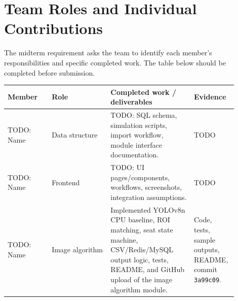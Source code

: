 \section{Team Roles and Individual Contributions}

The midterm requirement asks the team to identify each member's responsibilities and specific completed work. The table below should be completed before submission.

\begin{longtable}{|p{0.18\linewidth}|p{0.24\linewidth}|p{0.34\linewidth}|p{0.14\linewidth}|}
\hline
\textbf{Member} & \textbf{Role} & \textbf{Completed work / deliverables} & \textbf{Evidence} \\
\hline
TODO: Name & Data structure & TODO: SQL schema, simulation scripts, import workflow, module interface documentation. & TODO \\
\hline
TODO: Name & Frontend & TODO: UI pages/components, workflows, screenshots, integration assumptions. & TODO \\
\hline
TODO: Name & Image algorithm & Implemented YOLOv8n CPU baseline, ROI matching, seat state machine, CSV/Redis/MySQL output logic, tests, README, and GitHub upload of the image algorithm module. & Code, tests, sample outputs, README, commit \texttt{3a99c09}. \\
\hline
\end{longtable}


